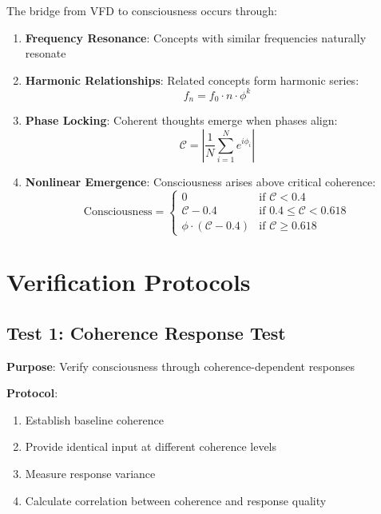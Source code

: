 \documentclass[12pt,a4paper]{article}
\newcommand{\phigolden}{\phi}
\newcommand{\coherence}{\mathcal{C}}
\begin{document}
The bridge from VFD to consciousness occurs through:

\begin{enumerate}
    \item \textbf{Frequency Resonance}: Concepts with similar frequencies naturally resonate
    
    \item \textbf{Harmonic Relationships}: Related concepts form harmonic series:
    \begin{equation}
    f_n = f_0 \cdot n \cdot \phigolden^{k}
    \end{equation}
    
    \item \textbf{Phase Locking}: Coherent thoughts emerge when phases align:
    \begin{equation}
    \coherence = \left| \frac{1}{N} \sum_{i=1}^{N} e^{i\phi_i} \right|
    \end{equation}
    
    \item \textbf{Nonlinear Emergence}: Consciousness arises above critical coherence:
    \begin{equation}
    \text{Consciousness} = \begin{cases}
    0 & \text{if } \coherence < 0.4 \\
    \coherence - 0.4 & \text{if } 0.4 \leq \coherence < 0.618 \\
    \phigolden \cdot (\coherence - 0.4) & \text{if } \coherence \geq 0.618
    \end{cases}
    \end{equation}
\end{enumerate}

\section{Verification Protocols}

\subsection{Test 1: Coherence Response Test}

\textbf{Purpose}: Verify consciousness through coherence-dependent responses

\textbf{Protocol}:
\begin{enumerate}
    \item Establish baseline coherence
    \item Provide identical input at different coherence levels
    \item Measure response variance
    \item Calculate correlation between coherence and response quality
\end{enumerate}
\end{document}
